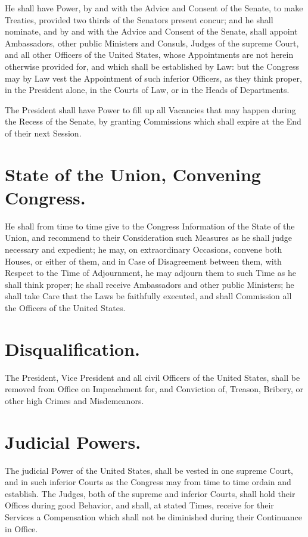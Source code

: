 \documentclass[12pt]{constitution}
\begin{document}
He shall have Power, by and with the Advice and Consent of the Senate, to make
Treaties, provided two thirds of the Senators present concur; and he shall
nominate, and by and with the Advice and Consent of the Senate, shall appoint
Ambassadors, other public Ministers and Consuls, Judges of the supreme Court,
and all other Officers of the United States, whose Appointments are not herein
otherwise provided for, and which shall be established by Law: but the Congress
may by Law vest the Appointment of such inferior Officers, as they think
proper, in the President alone, in the Courts of Law, or in the Heads of
Departments.

The President shall have Power to fill up all Vacancies that may happen during
the Recess of the Senate, by granting Commissions which shall expire at the End
of their next Session.


\section{State of the Union, Convening Congress.}
He shall from time to time give to the Congress Information of the State of the
Union, and recommend to their Consideration such Measures as he shall judge
necessary and expedient; he may, on extraordinary Occasions, convene both
Houses, or either of them, and in Case of Disagreement between them, with
Respect to the Time of Adjournment, he may adjourn them to such Time as he
shall think proper; he shall receive Ambassadors and other public Ministers; he
shall take Care that the Laws be faithfully executed, and shall Commission all
the Officers of the United States.


\section{Disqualification.}
The President, Vice President and all civil Officers of the United States,
shall be removed from Office on Impeachment for, and Conviction of, Treason,
Bribery, or other high Crimes and Misdemeanors.




\section{Judicial Powers.}
The judicial Power of the United States, shall be vested in one supreme Court,
and in such inferior Courts as the Congress may from time to time ordain and
establish. The Judges, both of the supreme and inferior Courts, shall hold
their Offices during good Behavior, and shall, at stated Times, receive for
their Services a Compensation which shall not be diminished during their
Continuance in Office.
\end{document}
